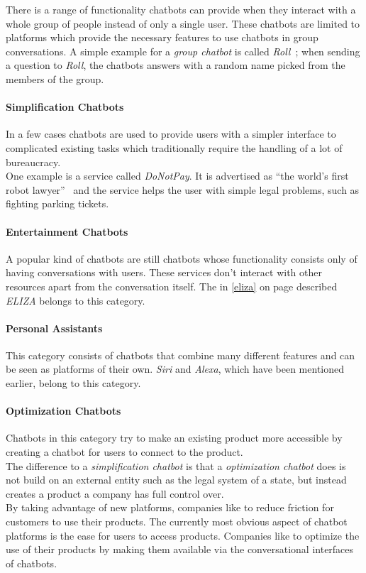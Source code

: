 There is a range of functionality chatbots can provide when they interact with a whole group of people instead of only a single user.
These chatbots are limited to platforms which provide the necessary features to use chatbots in group conversations.
A simple example for a \emph{group chatbot} is called \emph{Roll}~\cite{venturebeat};
when sending a question to \emph{Roll}, the chatbots answers with a random name picked from the members of the group.


\paragraph{Simplification Chatbots}

In a few cases chatbots are used to provide users with a simpler interface to complicated existing tasks which traditionally require the handling of a lot of bureaucracy.
\\
One example is a service called \emph{DoNotPay}.
It is advertised as ``the world's first robot lawyer''~\cite{oreilly} and the service helps the user with simple legal problems,
such as fighting parking tickets.


\paragraph{Entertainment Chatbots}

A popular kind of chatbots are still chatbots whose functionality consists only of having conversations with users.
These services don't interact with other resources apart from the conversation itself.
The in \ref{eliza} on page \pageref{eliza} described \emph{ELIZA} belongs to this category.


\paragraph{Personal Assistants}
\label{assistants}

This category consists of chatbots that combine many different features and can be seen as platforms of their own.
\emph{Siri} and \emph{Alexa}, which have been mentioned earlier, belong to this category.


\paragraph{Optimization Chatbots}

Chatbots in this category try to make an existing product more accessible by creating a chatbot for users to connect to the product.
\\
The difference to a \emph{simplification chatbot} is that a \emph{optimization chatbot} does is not build on an external entity such as the legal system of a state, but instead creates a product a company has full control over.
\\
By taking advantage of new platforms, companies like to reduce friction for customers to use their products.
The currently most obvious aspect of chatbot platforms is the ease for users to access products.
Companies like to optimize the use of their products by making them available via the conversational interfaces of chatbots.
\\

